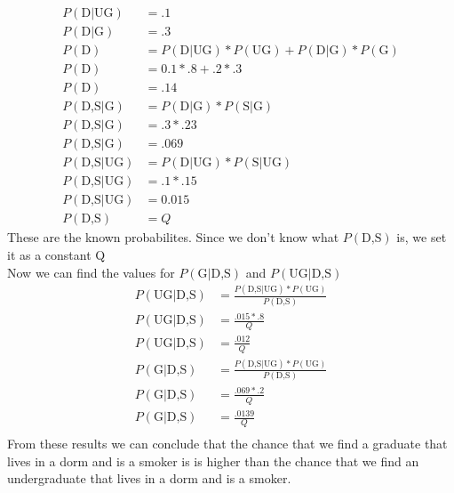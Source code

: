 \documentclass[12pt,english]{article}
\begin{document}
\begin{equation}
\begin{split}
P(\mbox{D}\vert \mbox{UG}) &= .1\\
P(\mbox{D}\vert \mbox{G}) &= .3\\
P(\mbox{D}) &= P(\mbox{D}\vert \mbox{UG}) * P(\mbox{UG})+ P(\mbox{D}\vert \mbox{G}) *  P(\mbox{G})\\
P(\mbox{D}) &= 0.1 * .8 + .2 * .3\\
P(\mbox{D}) &= .14\\
P(\mbox{D,S} \vert \mbox{G}) &=P(\mbox{D}\vert \mbox{G}) *P(\mbox{S}\vert \mbox{G})\\
P(\mbox{D,S} \vert \mbox{G}) &= .3 * .23\\
P(\mbox{D,S} \vert \mbox{G}) &= .069\\
P(\mbox{D,S} \vert \mbox{UG}) &=P(\mbox{D}\vert \mbox{UG}) *P(\mbox{S}\vert \mbox{UG})\\
P(\mbox{D,S} \vert \mbox{UG}) &= .1 * .15\\
P(\mbox{D,S} \vert \mbox{UG}) &=0.015\\
P(\mbox{D,S}) &= Q
\end{split}
\end{equation}
These are the known probabilites. Since we don't know what $P(\mbox{D,S})$ is, we set it as a constant Q\\
Now we can find the values for $P(\mbox{G}\vert \mbox{D,S})$ and $P(\mbox{UG}\vert \mbox{D,S})$\\
\begin{equation}
\begin{split}
P(\mbox{UG}\vert \mbox{D,S}) &=  \frac{P(\mbox{D,S} \vert \mbox{UG}) * P(\mbox{UG})}{P(\mbox{D,S})}\\
P(\mbox{UG}\vert \mbox{D,S}) &=\frac{.015 * .8}{Q}\\
P(\mbox{UG}\vert \mbox{D,S}) &=\frac{.012}{Q}\\
P(\mbox{G}\vert \mbox{D,S}) &=  \frac{P(\mbox{D,S} \vert \mbox{UG}) * P(\mbox{UG})}{P(\mbox{D,S})}\\
P(\mbox{G}\vert \mbox{D,S}) &=\frac{.069 *.2}{Q}\\
P(\mbox{G}\vert \mbox{D,S}) &=\frac{.0139}{Q}\\
\end{split}
\end{equation}
From these results we can conclude that the chance that we find a graduate that lives in a dorm and is a smoker is  is higher than the chance that we find an undergraduate that lives in a dorm and is a smoker.\par
\end{document}
